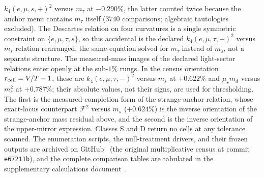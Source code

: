 \documentclass[aps,twocolumn,superscriptaddress,nofootinbib,floatfix]{revtex4-2}
\newcommand{\mstar}{\mu_\star}
\begin{document}
$k_4(e,\mu,s,+)^2$ versus $m_\tau$ at $-0.290\%$, the latter counted twice because the anchor menu contains $m_\tau$ itself ($3740$ comparisons; algebraic tautologies excluded). The Descartes relation on four curvatures is a single symmetric constraint on $\{e,\mu,\tau,s\}$, so this accidental is the declared $k_4(e,\mu,\tau,-)^2$ versus $m_s$ relation rearranged, the same equation solved for $m_\tau$ instead of $m_s$, not a separate structure. The measured-mass images of the declared light-sector relations enter openly at the sub-$1\%$ rungs. In the census orientation $r_{\rm cell}=V/T-1$, these are $k_4(e,\mu,\tau,-)^2$ versus $m_s$ at $+0.622\%$ and $\mstar m_d$ versus $m_s^2$ at $+0.787\%$; their absolute values, not their signs, are used for thresholding. The first is the measured-completion form of the strange-anchor relation, whose exact-locus counterpart $\mathcal{F}^2$ versus $m_s$ ($+0.624\%$) is the inverse orientation of the strange-anchor mass residual above, and the second is the inverse orientation of the upper-mirror expression. Classes S and D return no cells at any tolerance scanned. The enumeration scripts, the null-treatment drivers, and their frozen outputs are archived on GitHub~\cite{BrilliantGitHubEnum} (the original multiplicative census at commit \texttt{e67211b}), and the complete comparison tables are tabulated in the supplementary calculations document~\cite{BrilliantZenodoSupp}.
\end{document}
